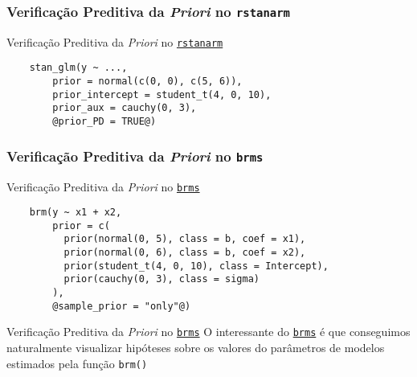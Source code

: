 \subsubsection{Verificação Preditiva da \textit{Priori} no \texttt{rstanarm}}
\begin{frame}[fragile]{Verificação Preditiva da \textit{Priori} no \href{http://mc-stan.org/rstanarm/}{\texttt{rstanarm}}}
	\begin{lstlisting}
    stan_glm(y ~ ...,
        prior = normal(c(0, 0), c(5, 6)),
        prior_intercept = student_t(4, 0, 10),
        prior_aux = cauchy(0, 3),
        @prior_PD = TRUE@)
    \end{lstlisting}
\end{frame}
\subsubsection{Verificação Preditiva da \textit{Priori} no \texttt{brms}}
\begin{frame}[fragile]{Verificação Preditiva da \textit{Priori} no \href{https://paul-buerkner.github.io/brms/}{\texttt{brms}}}
	\begin{lstlisting}
    brm(y ~ x1 + x2,
        prior = c(
          prior(normal(0, 5), class = b, coef = x1),
          prior(normal(0, 6), class = b, coef = x2),
          prior(student_t(4, 0, 10), class = Intercept),
          prior(cauchy(0, 3), class = sigma)
        ),
        @sample_prior = "only"@)
    \end{lstlisting}
\end{frame}

\begin{frame}{Verificação Preditiva da \textit{Priori} no \href{https://paul-buerkner.github.io/brms/}{\texttt{brms}}}
	O interessante do \href{https://paul-buerkner.github.io/brms/}{\texttt{brms}} é
	que conseguimos naturalmente visualizar hipóteses sobre os valores do parâmetros de modelos
	estimados pela função \lstinline!brm()!
	\begin{figure}
		\centering
		\resizebox{.35\linewidth}{!}{}
	\end{figure}
\end{frame}

